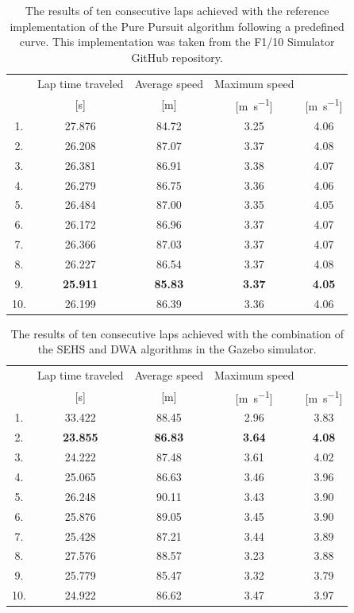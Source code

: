 \begin{table}
	\centering
	\label{tbl:reference-impl}
	\begin{tabular}{c c c c c}
		\toprule
		& Lap time       traveled  & Average speed             & Maximum speed             \\
		& [\si{\second}] & [\si{\meter}]      & [\si{\meter\per\second}]  & [\si{\meter\per\second}]  \\
		\midrule
		1. & 27.876 & 84.72 & 3.25 & 4.06 \\
		2. & 26.208 & 87.07 & 3.37 & 4.08 \\
		3. & 26.381 & 86.91 & 3.38 & 4.07 \\
		4. & 26.279 & 86.75 & 3.36 & 4.06 \\
		5. & 26.484 & 87.00 & 3.35 & 4.05 \\
		6. & 26.172 & 86.96 & 3.37 & 4.07 \\
		7. & 26.366 & 87.03 & 3.37 & 4.07 \\
		8. & 26.227 & 86.54 & 3.37 & 4.08 \\
		9. & \textbf{25.911} & \textbf{85.83} & \textbf{3.37} & \textbf{4.05} \\
		10. & 26.199 & 86.39 & 3.36 & 4.06 \\
	
		\bottomrule
	\end{tabular}
	\caption{The results of ten consecutive laps achieved with the reference implementation of the Pure Pursuit algorithm following a predefined curve. This implementation was taken from the F1/10 Simulator GitHub repository.}
\end{table}

\begin{table}
	\centering
	\label{tbl:dwa}
	\begin{tabular}{c c c c c}
		\toprule
		    & Lap time       traveled  & Average speed             & Maximum speed             \\
		    & [\si{\second}] & [\si{\meter}]      & [\si{\meter\per\second}]  & [\si{\meter\per\second}]  \\
		\midrule
		1. & 33.422 & 88.45 & 2.96 & 3.83 \\
		2. & \textbf{23.855} & \textbf{86.83} & \textbf{3.64} & \textbf{4.08} \\
		3. & 24.222 & 87.48 & 3.61 & 4.02 \\
		4. & 25.065 & 86.63 & 3.46 & 3.96 \\
		5. & 26.248 & 90.11 & 3.43 & 3.90 \\
		6. & 25.876 & 89.05 & 3.45 & 3.90 \\
		7. & 25.428 & 87.21 & 3.44 & 3.89 \\
		8. & 27.576 & 88.57 & 3.23 & 3.88 \\
		9. & 25.779 & 85.47 & 3.32 & 3.79 \\
		10.& 24.922 & 86.62 & 3.47 & 3.97 \\
		\bottomrule
	\end{tabular}
	\caption{The results of ten consecutive laps achieved with the combination of the SEHS and DWA algorithms in the Gazebo simulator.}
\end{table}


